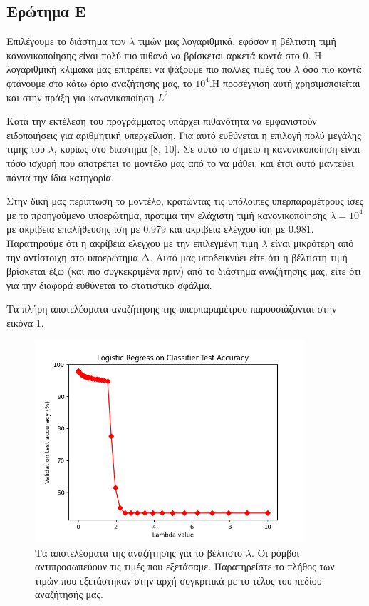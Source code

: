 \documentclass{article}
\newcommand{\code}{\texttt}
\begin{document}
\subsection{Ερώτημα Ε}
Επιλέγουμε το διάστημα των \code{$\lambda$} τιμών μας λογαριθμικά, εφόσον η βέλτιστη τιμή κανονικοποίησης είναι πολύ πιο πιθανό να βρίσκεται αρκετά κοντά στο 0. Η λογαριθμική κλίμακα μας επιτρέπει να ψάξουμε πιο πολλές τιμές του \code{$\lambda$} όσο πιο κοντά φτάνουμε στο κάτω όριο αναζήτησης μας, το $10^{4}$.Η προσέγγιση αυτή χρησιμοποιείται και στην πράξη για κανονικοποίηση $L^{2}$ \cite{jerome}\par

Κατά την εκτέλεση του προγράμματος υπάρχει πιθανότητα να εμφανιστούν ειδοποιήσεις για αριθμητική υπερχείλιση. Για αυτό ευθύνεται η επιλογή πολύ μεγάλης τιμής του \code{$\lambda$}, κυρίως στο δίαστημα [8, 10]. Σε αυτό το σημείο η κανονικοποίηση είναι τόσο ισχυρή που αποτρέπει το μοντέλο μας από το να μάθει, και έτσι αυτό μαντεύει πάντα την ίδια κατηγορία.\par

Στην δική μας περίπτωση το μοντέλο, κρατώντας τις υπόλοιπες υπερπαραμέτρους ίσες με το προηγούμενο υποερώτημα, προτιμά την ελάχιστη τιμή κανονικοποίησης \code{$\lambda = 10^{4}$} με ακρίβεια επαλήθευσης ίση με 0.979 και ακρίβεια ελέγχου ίση με 0.981. Παρατηρούμε ότι η ακρίβεια ελέγχου με την επιλεγμένη τιμή \code{$\lambda$} είναι μικρότερη από την αντίστοιχη στο υποερώτημα Δ. Αυτό μας υποδεικνύει είτε ότι η βέλτιστη τιμή βρίσκεται έξω (και πιο συγκεκριμένα πριν) από το διάστημα αναζήτησης μας, είτε ότι για την διαφορά ευθύνεται το στατιστικό σφάλμα. \par

Τα πλήρη αποτελέσματα αναζήτησης της υπερπαραμέτρου παρουσιάζονται στην εικόνα \ref{logistic_lambda_accuracy}.

\begin{figure}
	\label{logistic_lambda_accuracy}
	\includegraphics[width=10cm]{logistic_lambda_accuracy.png}
	\centering
	\caption{ Τα αποτελέσματα της αναζήτησης για το βέλτιστο \code{$\lambda$}. Οι ρόμβοι αντιπροσωπεύουν τις τιμές που εξετάσαμε. Παρατηρείστε το πλήθος των τιμών που εξετάστηκαν στην αρχή συγκριτικά με το τέλος του πεδίου αναζήτησής μας.}
\end{figure}
\end{document}
